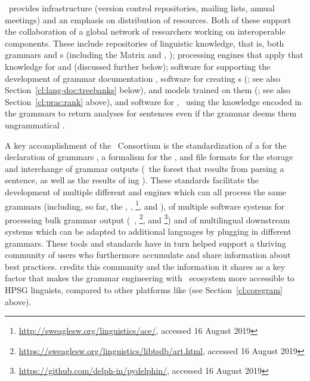 \documentclass[output=paper,nonflat]{langsci/langscibook}
\begin{document}
\delphin\ provides infrastructure (version control repositories,
mailing lists, annual meetings) and an emphasis on 
distribution of resources. Both of these support the collaboration of a
global network of researchers working on interoperable
components. These include repositories of linguistic knowledge, that
is, both grammars and s (including the Matrix and ,
\citealt{Fokkens:14}); processing engines that apply that
knowledge for  and  (discussed further below);
software for supporting the development of grammar documentation
\citep[e.g.,][]{Hashimoto-etal:07}, software for creating s
(\citealt{OFTM2004a-u,Packard:15}; see also Section~\ref{cl:lang-doc:treebanks} below), 
and  models trained on them
(\citealt{Tou:Man:Fli:Oep:05}; see also Section~\ref{cl:prac:rank} above), and
software for , \ie\ using the knowledge encoded in
the grammars to return analyses for sentences even if the grammar
deems them ungrammatical
\citep{W11-2923,buys2017parse,chen2018parse}.

A key accomplishment of the \delphin\ Consortium is the standardization
of a  for the declaration of grammars
\citep{Copestake:02:CLE}, a formalism for the 
\citep{CFPS2005a}, and file formats for the storage and interchange of
grammar outputs (\eg\ the forest that results from parsing a sentence,
as well as the results of ing \citep{Oepen:01,OFTM2004a-u}).
These standards facilitate the development of multiple different
 and  engines which can all process the same grammars
(including, so far,
the  \citep{Copestake2002a},
 \citep{callmeier00},
\footnote{\url{http://sweaglesw.org/linguistics/ace/}, accessed 16 August 2019},
and  \citep{Slayden2012a-u}),
of multiple software systems for processing bulk grammar output
(\itsdb\ \citep{Oepen:01},\is{\itsdb}
\footnote{\url{https://sweaglesw.org/linguistics/libtsdb/art.html}, accessed 16 August 2019}, and \footnote{\url{https://github.com/delph-in/pydelphin/}, accessed 16 August 2019})
and of multilingual downstream systems which can be adapted to additional
languages by plugging in different grammars.
These tools and standards have in turn helped support a thriving community
of users who furthermore accumulate and share information about best practices.
\citet[234]{MelnikHandWritten} credits this community and the information it
shares as a key factor that makes the grammar engineering with
\delphin\ ecosystem more accessible to HPSG linguists, 
compared to other platforms like  (see Section~\ref{cl:coregram} above).
\end{document}
